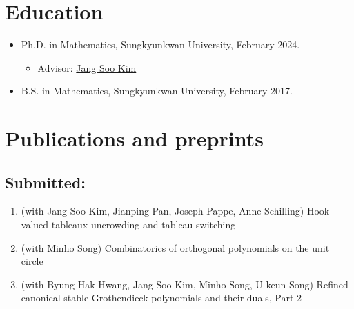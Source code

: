 \documentclass[letterpaper]{article}
\begin{document}
\section*{Education}

\begin{itemize}
  \item Ph.D. in Mathematics, Sungkyunkwan University, February 2024.
    \begin{itemize}
    \item Advisor: \href{https://jangsookim.github.io/}{Jang Soo Kim}
    \end{itemize}

  \item B.S. in Mathematics, Sungkyunkwan University, February 2017.
\end{itemize}









\section*{Publications and preprints}


\subsection*{Submitted:}
\begin{enumerate}
\item (with Jang Soo Kim, Jianping Pan, Joseph Pappe, Anne Schilling) Hook-valued tableaux uncrowding and tableau switching
\item (with Minho Song) Combinatorics of orthogonal polynomials on the unit circle
\item (with Byung-Hak Hwang, Jang Soo Kim, Minho Song, U-keun Song) Refined canonical stable Grothendieck polynomials and their duals, Part 2
\end{enumerate}
\end{document}
